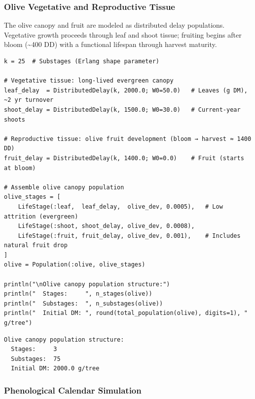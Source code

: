 \subsubsection{Olive Vegetative and Reproductive Tissue}



\label{17722492359396041071}{}


The olive canopy and fruit are modeled as distributed delay populations. Vegetative growth proceeds through leaf and shoot tissue; fruiting begins after bloom ({\textasciitilde}400 DD) with a functional lifespan through harvest maturity.




\begin{verbatim}
k = 25  # Substages (Erlang shape parameter)

# Vegetative tissue: long-lived evergreen canopy
leaf_delay  = DistributedDelay(k, 2000.0; W0=50.0)   # Leaves (g DM), ~2 yr turnover
shoot_delay = DistributedDelay(k, 1500.0; W0=30.0)   # Current-year shoots

# Reproductive tissue: olive fruit development (bloom → harvest ≈ 1400 DD)
fruit_delay = DistributedDelay(k, 1400.0; W0=0.0)    # Fruit (starts at bloom)

# Assemble olive canopy population
olive_stages = [
    LifeStage(:leaf,  leaf_delay,  olive_dev, 0.0005),   # Low attrition (evergreen)
    LifeStage(:shoot, shoot_delay, olive_dev, 0.0008),
    LifeStage(:fruit, fruit_delay, olive_dev, 0.001),    # Includes natural fruit drop
]
olive = Population(:olive, olive_stages)

println("\nOlive canopy population structure:")
println("  Stages:     ", n_stages(olive))
println("  Substages:  ", n_substages(olive))
println("  Initial DM: ", round(total_population(olive), digits=1), " g/tree")
\end{verbatim}




\begin{verbatim}
Olive canopy population structure:
  Stages:     3
  Substages:  75
  Initial DM: 2000.0 g/tree
\end{verbatim}



\subsubsection{Phenological Calendar Simulation}



\label{5629042327993150102}{}


